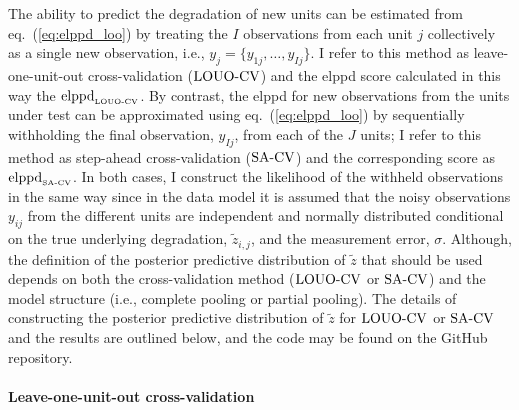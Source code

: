 The ability to predict the degradation of new units can be estimated from eq.~(\ref{eq:elppd_loo}) by treating the $I$ observations from each unit $j$ collectively as a single new observation, i.e., $y_j = \{y_{1j}, \ldots, y_{Ij}\}$. I refer to this method as leave-one-unit-out cross-validation ($\hbox{LOUO-CV}$) and the elppd score calculated in this way the $\hbox{elppd}_{\hbox{\tiny{LOUO-CV}}}$. By contrast, the elppd for new observations from the units under test can be approximated using eq.~(\ref{eq:elppd_loo}) by sequentially withholding the final observation, $y_{Ij}$, from each of the $J$ units; I refer to this method as step-ahead cross-validation ($\hbox{SA-CV}$) and the corresponding score as $\hbox{elppd}_{\hbox{\tiny{SA-CV}}}$. In both cases, I construct the likelihood of the withheld observations in the same way since in the data model it is assumed that the noisy observations $y_{ij}$ from the different units are independent and normally distributed conditional on the true underlying degradation, $\tilde{z}_{i, j}$, and the measurement error, $\sigma$. Although, the definition of the posterior predictive distribution of $\tilde{z}$ that should be used depends on both the cross-validation method ($\hbox{LOUO-CV}$ or $\hbox{SA-CV}$) and the model structure (i.e., complete pooling or partial pooling). The details of constructing the posterior predictive distribution of $\tilde{z}$ for $\hbox{LOUO-CV}$ or $\hbox{SA-CV}$ and the results are outlined below, and the code may be found on the GitHub repository.



\paragraph{Leave-one-unit-out cross-validation} 

